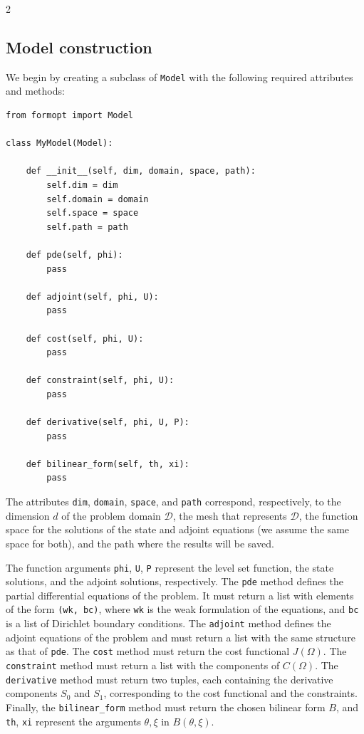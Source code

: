 \documentclass[a4paper, oneside]{article}
\newcommand{\code}[1]{\texttt{#1}}
\begin{document}
\begin{multicols}{2}
\subsection{Model construction}
\label{sub:model}

We begin by creating a subclass of \code{Model}
with the following required attributes and methods:
\begin{lstlisting}
from formopt import Model

class MyModel(Model):

    def __init__(self, dim, domain, space, path):
        self.dim = dim
        self.domain = domain
        self.space = space
        self.path = path

	def pde(self, phi):
		pass
	
	def adjoint(self, phi, U):
		pass

	def cost(self, phi, U):
		pass
	
    def constraint(self, phi, U):
		pass

	def derivative(self, phi, U, P):
	 	pass
	
	def bilinear_form(self, th, xi):
		pass
\end{lstlisting}
The attributes \code{dim}, \code{domain}, \code{space}, and \code{path}
correspond, respectively, to the dimension $d$ of the problem domain $\mathcal{D}$,
the mesh that represents $\mathcal{D}$,
the function space for the solutions of the state and adjoint equations
(we assume the same space for both),
and the path where the results will be saved. 

The function arguments \code{phi}, \code{U}, \code{P} represent
the level set function, the state solutions, and the adjoint solutions, respectively.
The \code{pde} method defines the partial differential equations of the problem.
It must return a list with elements of the form \code{(wk, bc)},
where \code{wk} is the weak formulation of the equations,
and \code{bc} is a list of Dirichlet boundary conditions.
The \code{adjoint} method defines the adjoint equations of the problem and
must return a list with the same structure as that of \code{pde}. 
The \code{cost} method must return the cost functional $J(\Omega)$.
The \code{constraint} method must return a list with the components of $C(\Omega)$.
The \code{derivative} method must return two tuples,
each containing the derivative components $S_0$ and $S_1$,
corresponding to the cost functional and the constraints.
Finally, the \code{bilinear\_form} method must return
the chosen bilinear form $B$, and \code{th},  \code{xi}
represent the arguments $\theta, \xi$ in $B(\theta, \xi)$.




\end{multicols}
\end{document}

